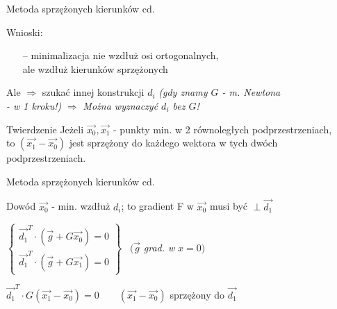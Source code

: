   \begin{frame}{Metoda sprzężonych kierunków cd.}

 	\begin{block}{Wnioski:}
		\begin{itemize}
			\item[--] minimalizacja nie wzdłuż osi ortogonalnych,
			\\ale wzdłuż kierunków sprzężonych
		\end{itemize}
 	\end{block}
 	\begin{block}{}
		Ale $\Rightarrow$ szukać innej konstrukcji $d_i$ \emph{(gdy znamy $G$ - m. Newtona
		\\- w 1 kroku!)} $\Rightarrow$ \emph{Można wyznaczyć $d_i$ bez $G$!}
 	\end{block}
 	\begin{block}{Twierdzenie}
		Jeżeli $\vec{x_0}, \vec{x_1}$ - punkty min. w 2 równoległych podprzestrzeniach,
		\\to $(\vec{x_1} - \vec{x_0})$ jest sprzężony do każdego wektora w tych dwóch podprzestrzeniach.
 	\end{block}

  \end{frame}

  \begin{frame}{Metoda sprzężonych kierunków cd. }

 	\begin{block}{Dowód}
	  $\vec{x_0}$ - min. wzdłuż $d_i$; to gradient F w $\vec{x_0}$ musi być $\perp \vec{d_1}$
	  \smallskip
	  \begin{center}
	    $ \left\{
          \begin{array}{l}
            \vec{d_1}^T \cdot (\vec{g} + G \vec{x_0}) = 0 \\
            \vec{d_1}^T \cdot (\vec{g} + G \vec{x_1}) = 0
	      \end{array}
	    \right\} $
	    \ $(\vec{g}$ \emph{grad. w} $x = 0)$
	  \end{center}
	  \begin{center}
	    $\vec{d_1}^T \cdot G (\vec{x_1} - \vec{x_0}) = 0 \qquad (\vec{x_1} - \vec{x_0})$ sprzężony do $\vec{d_1}$
	  \end{center}
 	\end{block}

  \end{frame}

